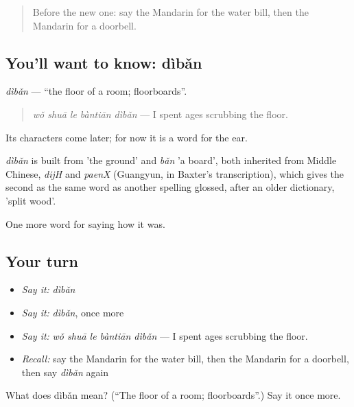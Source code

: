 \label{lesson:ZH-C522-diban}



\begin{quote}
Before the new one: say the Mandarin for the water bill, then the Mandarin for a doorbell.
\end{quote}

\subsection*{You'll want to know: dìbǎn}
\emph{dìbǎn} — \textquotedblleft{}the floor of a room; floorboards\textquotedblright{}.

\begin{quote}
\emph{wǒ shuā le bàntiān dìbǎn} — I spent ages scrubbing the floor.
\end{quote}

Its characters come later; for now it is a word for the ear.

\begin{cousinweb}
\emph{dìbǎn} is built from  'the ground' and \emph{bǎn} 'a board', both inherited from Middle Chinese, \emph{dijH} and \emph{paenX} (Guangyun, in Baxter's transcription), which gives the second as the same word as another spelling glossed, after an older dictionary, 'split wood'.
\end{cousinweb}

\begin{grammarlens}[title={What you've built}]
One more word for saying how it was.
\end{grammarlens}

\subsection*{Your turn}
\begin{itemize}
\raggedright
  \item \emph{Say it:} \emph{dìbǎn}
  \item \emph{Say it:} \emph{dìbǎn}, once more
  \item \emph{Say it:} \emph{wǒ shuā le bàntiān dìbǎn} — I spent ages scrubbing the floor.
  \item \emph{Recall:} say the Mandarin for the water bill, then the Mandarin for a doorbell, then say \emph{dìbǎn} again
\end{itemize}

\begin{tcolorbox}[breakable,colback=teal!4,colframe=teal!35!black,title={Before you move on}]
What does dìbǎn mean? (\textquotedblleft{}The floor of a room; floorboards\textquotedblright{}.) Say it once more.
\end{tcolorbox}
